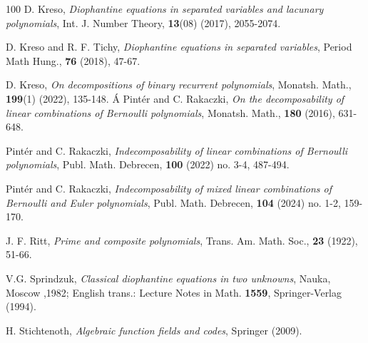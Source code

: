 \documentclass[12pt]{amsart}
\begin{document}
\begin{thebibliography}{100}
 D. Kreso, \emph{Diophantine equations in separated variables and lacunary polynomials}, Int. J. Number Theory, \textbf{13}(08) (2017), 2055-2074.
		
 D. Kreso and R. F. Tichy, \emph{Diophantine equations in separated variables}, Period Math Hung., \textbf{76} (2018), 47-67.
	
 D. Kreso, \emph{On decompositions of binary recurrent polynomials}, Monatsh. Math., \textbf{199}(1) (2022), 135-148. 
 {Á} Pint\'er and C. Rakaczki, \emph{On the decomposability of linear combinations of Bernoulli polynomials}, Monatsh. Math., \textbf{180} (2016), 631-648. 
 

	
 Pint\'er and C. Rakaczki, \emph{Indecomposability of linear combinations of Bernoulli polynomials}, Publ. Math. Debrecen, \textbf{100} (2022) no. 3-4, 487-494.
	
 Pint\'er and C. Rakaczki, \emph{Indecomposability of mixed linear combinations of Bernoulli and Euler polynomials}, Publ. Math. Debrecen, \textbf{104} (2024) no. 1-2, 159-170.

 J. F. Ritt, \emph{Prime and composite polynomials}, Trans. Am. Math. Soc., \textbf{23} (1922), 51-66.

 V.G. Sprindzuk, \emph{Classical diophantine equations in two unknowns},  Nauka, Moscow ,1982; English trans.: Lecture Notes in Math. \textbf{1559}, Springer-Verlag (1994).
		

H. Stichtenoth, \emph{Algebraic function fields and codes}, Springer (2009).

\end{thebibliography}
\end{document}
